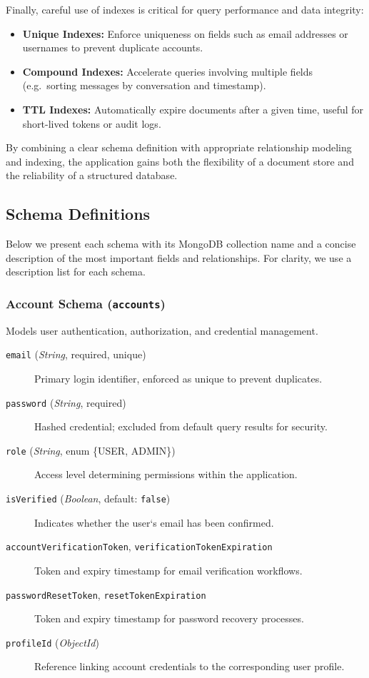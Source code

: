 Finally, careful use of indexes is critical for query performance and data integrity:
\begin{itemize}
  \item \textbf{Unique Indexes:}  Enforce uniqueness on fields such as email addresses or usernames to prevent duplicate accounts.
  \item \textbf{Compound Indexes:}  Accelerate queries involving multiple fields (e.g.\ sorting messages by conversation and timestamp).
  \item \textbf{TTL Indexes:}  Automatically expire documents after a given time, useful for short-lived tokens or audit logs.
\end{itemize}

By combining a clear schema definition with appropriate relationship modeling and indexing, the application gains both the flexibility of a document store and the reliability of a structured database. 

\subsection{Schema Definitions}

Below we present each schema with its MongoDB collection name and a concise description of the most important fields and relationships.  For clarity, we use a description list for each schema.

\subsubsection{Account Schema (\texttt{accounts})}
Models user authentication, authorization, and credential management.
\begin{description}
  \item[\texttt{email} (\emph{String}, required, unique)]  
    Primary login identifier, enforced as unique to prevent duplicates.
  \item[\texttt{password} (\emph{String}, required)]  
    Hashed credential; excluded from default query results for security.
  \item[\texttt{role} (\emph{String}, enum \{USER, ADMIN\})]  
    Access level determining permissions within the application.
  \item[\texttt{isVerified} (\emph{Boolean}, default: \texttt{false})]  
    Indicates whether the user`s email has been confirmed.
  \item[\texttt{accountVerificationToken}, \texttt{verificationTokenExpiration}]  
    Token and expiry timestamp for email verification workflows.
  \item[\texttt{passwordResetToken}, \texttt{resetTokenExpiration}]  
    Token and expiry timestamp for password recovery processes.
  \item[\texttt{profileId} (\emph{ObjectId})]  
    Reference linking account credentials to the corresponding user profile.
\end{description}

